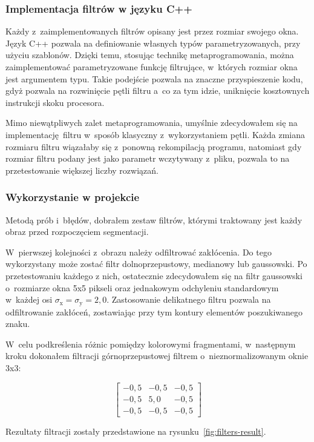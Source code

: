\subsubsection{Implementacja filtrów w języku C++}
Każdy z~zaimplementowanych filtrów opisany jest przez rozmiar swojego okna. Język C++ pozwala na definiowanie własnych typów parametryzowanych, przy użyciu szablonów. Dzięki temu, stosując technikę metaprogramowania, można zaimplementować parametryzowane funkcję filtrujące, w~których rozmiar okna jest argumentem typu. Takie podejście pozwala na znaczne przyspieszenie kodu, gdyż pozwala na rozwinięcie pętli filtru a~co za tym idzie, uniknięcie kosztownych instrukcji skoku procesora. 

Mimo niewątpliwych zalet metaprogramowania, umyślnie zdecydowałem się na implementację filtru w~sposób klasyczny z~wykorzystaniem pętli. Każda zmiana rozmiaru filtru wiązałaby się z~ponowną rekompilacją programu, natomiast gdy rozmiar filtru podany jest jako parametr wczytywany z~pliku, pozwala to na przetestowanie większej liczby rozwiązań. 

\subsubsection{Wykorzystanie w projekcie}
Metodą prób i~błędów, dobrałem zestaw filtrów, którymi traktowany jest każdy obraz przed rozpoczęciem segmentacji. 

W~pierwszej kolejności z~obrazu należy odfiltrować zakłócenia. Do tego wykorzystany może zostać filtr dolnoprzepustowy, medianowy lub gaussowski. Po przetestowaniu każdego z nich, ostatecznie zdecydowałem się na filtr gaussowski o~rozmiarze okna 5x5 pikseli oraz jednakowym odchyleniu standardowym w~każdej osi $\sigma_{\mathrm{x}} = \sigma_{\mathrm{y}} = 2{,}0$. Zastosowanie delikatnego filtru pozwala na odfiltrowanie zakłóceń, zostawiając przy tym kontury elementów poszukiwanego znaku. 

W~celu podkreślenia różnic pomiędzy kolorowymi fragmentami, w~następnym kroku dokonałem filtracji górnoprzepustowej filtrem o~nieznormalizowanym oknie 3x3:

$$
\begin{bmatrix}
    -0{,}5 & -0{,}5 & -0{,}5 \\
    -0{,}5 &  5{,}0 & -0{,}5 \\
    -0{,}5 & -0{,}5 & -0{,}5 
\end{bmatrix}
$$

Rezultaty filtracji zostały przedstawione na rysunku~\ref{fig:filters-result}.

